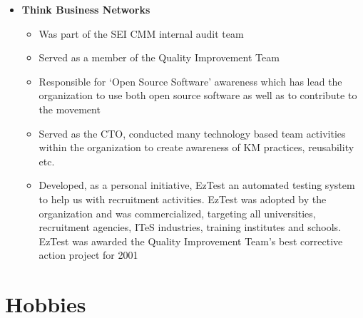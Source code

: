 \documentclass[a4paper,12pt]{article}
\begin{document}
\begin{itemize}
\begin{itemize}
    \end{itemize}

  \item{\textbf{Think Business Networks}}

    \begin{itemize}
      \setlength\itemsep{-0.5em}
      \item Was part of the SEI CMM internal audit team 

      \item Served as a member of the Quality Improvement Team 

      \item Responsible for `Open Source Software' awareness which has
        lead the organization to use both open source software as well
        as to contribute to the movement

      \item Served as the CTO, conducted many technology based team
        activities within the organization to create awareness of KM
        practices, reusability etc.

      \item Developed, as a personal initiative, EzTest an automated
        testing system to help us with recruitment activities. EzTest
        was adopted by the organization and was commercialized,
        targeting all universities, recruitment agencies, ITeS
        industries, training institutes and schools. EzTest was
        awarded the Quality Improvement Team's best corrective action
        project for 2001
        
    \end{itemize}
\end{itemize}

\section*{Hobbies}
\end{document}
